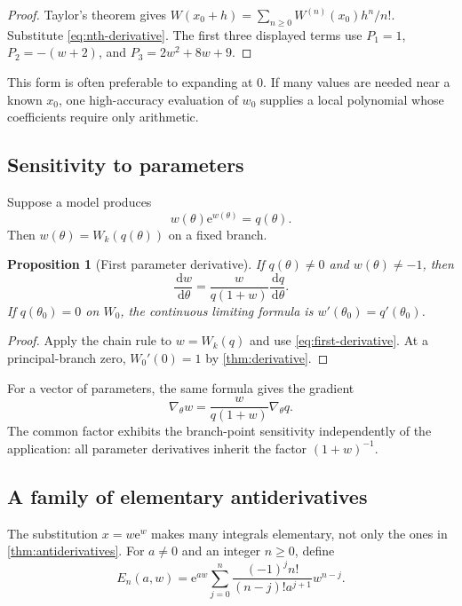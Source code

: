 \documentclass[11pt]{article}
\numberwithin{equation}{section}
\newtheorem{proposition}[theorem]{Proposition}
\theoremstyle{definition}
\theoremstyle{remark}
\newcommand{\e}{\mathrm e}
\newcommand{\dd}{\,\mathrm d}
\begin{document}
\begin{proof}
Taylor's theorem gives
$W(x_0+h)=\sum_{n\ge0}W^{(n)}(x_0)h^n/n!$.  Substitute
\eqref{eq:nth-derivative}.  The first three displayed terms use
$P_1=1$, $P_2=-(w+2)$, and $P_3=2w^2+8w+9$.
\end{proof}

This form is often preferable to expanding at $0$.  If many values are needed
near a known $x_0$, one high-accuracy evaluation of $w_0$ supplies a local
polynomial whose coefficients require only arithmetic.

\subsection{Sensitivity to parameters}

Suppose a model produces
\begin{equation}
  w(\theta)\e^{w(\theta)}=q(\theta).                  \label{eq:parametric-W}
\end{equation}
Then $w(\theta)=W_k(q(\theta))$ on a fixed branch.

\begin{proposition}[First parameter derivative]
\label{prop:parameter-derivative}
If $q(\theta)\ne0$ and $w(\theta)\ne-1$, then
\begin{equation}
 \frac{\dd w}{\dd\theta}
 =\frac{w}{q(1+w)}\frac{\dd q}{\dd\theta}.            \label{eq:parameter-derivative}
\end{equation}
If $q(\theta_0)=0$ on $W_0$, the continuous limiting formula is
$w'(\theta_0)=q'(\theta_0)$.
\end{proposition}

\begin{proof}
Apply the chain rule to $w=W_k(q)$ and use
\eqref{eq:first-derivative}.  At a principal-branch zero,
$W_0'(0)=1$ by \cref{thm:derivative}.
\end{proof}

For a vector of parameters, the same formula gives the gradient
\[
  \nabla_{\theta}w
  =\frac{w}{q(1+w)}\nabla_{\theta}q.
\]
The common factor exhibits the branch-point sensitivity independently of the
application: all parameter derivatives inherit the factor $(1+w)^{-1}$.

\subsection{A family of elementary antiderivatives}

The substitution $x=w\e^w$ makes many integrals elementary, not only the ones
in \cref{thm:antiderivatives}.  For $a\ne0$ and an integer $n\ge0$, define
\begin{equation}
 E_n(a,w)=\e^{aw}\sum_{j=0}^{n}
   \frac{(-1)^j n!}{(n-j)!a^{j+1}}w^{n-j}.            \label{eq:E-n}
\end{equation}
\end{document}
